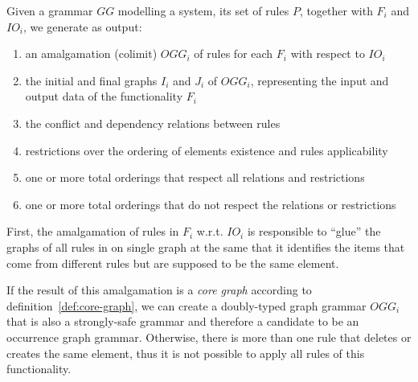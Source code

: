 Given a grammar $GG$ modelling a system, its set of rules $P$, together with $F_i$ and $IO_i$, we generate as output:

\begin{enumerate}
\item an amalgamation (colimit) $OGG_i$ of rules for each $F_i$ with respect to $IO_i$
\item the initial and final graphs $I_i$ and $J_i$ of $OGG_i$, representing the input and output data of the functionality $F_i$
\item the conflict and dependency relations between rules 
\item restrictions over the ordering of elements existence and rules applicability
\item one or more total orderings that respect all relations and restrictions
\item one or more total orderings that do not respect the relations or restrictions
\end{enumerate}

First, the amalgamation of rules in $F_i$ w.r.t. $IO_i$ is responsible to ``glue'' the graphs of all rules in on single graph at the same that it identifies the items that come from different rules but are supposed to be the same element. 

If the result of this amalgamation is a \emph{core graph} according to definition~\ref{def:core-graph}, we can create a doubly-typed graph grammar $OGG_i$ that is also a strongly-safe grammar and therefore a candidate to be an occurrence graph grammar. Otherwise, there is more than one rule that deletes or creates
the same element, thus it is not possible to apply all rules of this functionality.



